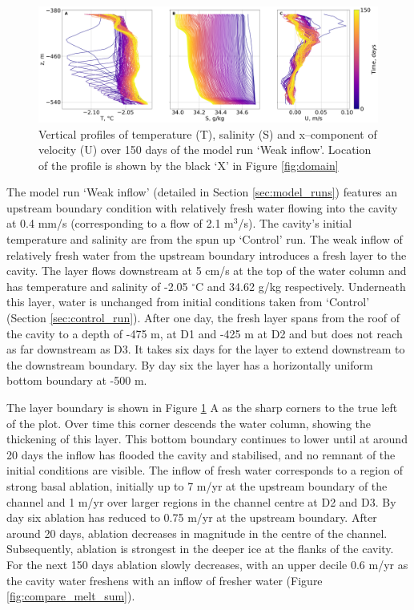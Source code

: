 \begin{figure}[!ht]
\centering
\includegraphics[width=1\textwidth]{chapters/4/weak_inflow_TSU.png}
\caption[Weak inflow (T,S,U)]{Vertical profiles of temperature (T), salinity (S) and x--component of velocity (U) over 150 days of the model run `Weak inflow'. Location of the profile is shown by the black `X' in Figure \ref{fig:domain}}
\label{fig:weak_inflow_TSU}
\end{figure}

The model run `Weak inflow' (detailed in Section \ref{sec:model_runs}) features an upstream boundary condition with relatively fresh water flowing into the cavity at 0.4 mm/s (corresponding to a flow of 2.1 $\mathrm{m}^3$/s). The cavity's initial temperature and salinity are from the spun up `Control' run.
The weak inflow of relatively fresh water from the upstream boundary introduces a fresh layer to the cavity. The layer flows downstream at 5 cm/s at the top of the water column and has temperature and salinity of -2.05 $^{\circ}$C and 34.62 g/kg respectively. Underneath this layer, water is unchanged from initial conditions taken from `Control' (Section \ref{sec:control_run}). After one day, the fresh layer spans from the roof of the cavity to a depth of -475 m, at D1 and -425 m at D2 and but does not reach as far downstream as D3. It takes six days for the layer to extend downstream to the downstream boundary. By day six the layer has a horizontally uniform bottom boundary at -500 m. 

The layer boundary is shown in Figure \ref{fig:weak_inflow_TSU} A as the sharp corners to the true left of the plot. Over time this corner descends the water column, showing the thickening of this layer.  This bottom boundary continues to lower until at around 20 days the inflow has flooded the cavity and stabilised, and no remnant of the initial conditions are visible.  
The inflow of fresh water corresponds to a region of strong basal ablation, initially up to 7 m/yr at the upstream boundary of the channel and 1 m/yr over larger regions in the channel centre at D2 and D3. By day six ablation has reduced to 0.75 m/yr at the upstream boundary. After around 20 days, ablation decreases in magnitude in the centre of the channel. Subsequently, ablation is strongest in the deeper ice at the flanks of the cavity. For the next 150 days ablation slowly decreases, with an upper decile 0.6 m/yr as the cavity water freshens with an inflow of fresher water (Figure \ref{fig:compare_melt_sum}). 

